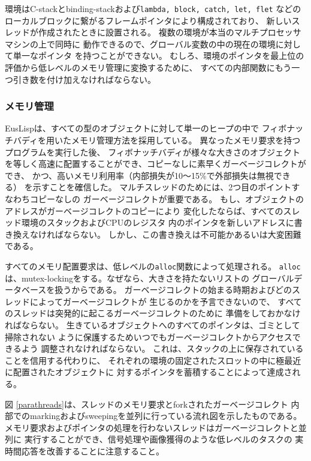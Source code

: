 環境はC-stackとbinding-stackおよび{\tt lambda, block, catch, let, flet}
などのローカルブロックに繋がるフレームポインタにより構成されており、
新しいスレッドが作成されたときに設置される。
複数の環境が本当のマルチプロセッサマシンの上で同時に
動作できるので、グローバル変数の中の現在の環境に対して単一なポインタ
を持つことができない。
むしろ、環境のポインタを最上位の評価から低レベルのメモリ管理に変換するために、
すべての内部関数にもう一つ引き数を付け加えなければならない。

\subsubsection{メモリ管理}
EusLispは、すべての型のオブジェクトに対して単一のヒープの中で
フィボナッチバディを用いたメモリ管理方法を採用している。
異なったメモリ要求を持つプログラムを実行した後、
フィボナッチバディが様々な大きさのオブジェクトを等しく高速に配置することができ、コピーなしに素早くガーベージコレクトができ、
かつ、高いメモリ利用率（内部損失が10〜15\%で外部損失は無視できる）
を示すことを確信した。
マルチスレッドのためには、2つ目のポイントすなわちコピーなしの
ガーベージコレクトが重要である。
もし、オブジェクトのアドレスがガーベージコレクトのコピーにより
変化したならば、すべてのスレッド環境のスタックおよびCPUのレジスタ
内のポインタを新しいアドレスに書き換えなければならない。
しかし、この書き換えは不可能かあるいは大変困難である。

すべてのメモリ配置要求は、低レベルの{\tt alloc}関数によって処理される。
{\tt alloc}は、mutex-lockingをする。なぜなら、大きさを持たないリストの
グローバルデータベースを扱うからである。
ガーベージコレクトの始まる時期およびどのスレッドによってガーベージコレクトが
生じるのかを予言できないので、
すべてのスレッドは突発的に起こるガーベージコレクトのために
準備をしておかなければならない。
生きているオブジェクトへのすべてのポインタは、ゴミとして掃除されない
ように保護するためいつでもガーベージコレクトからアクセスできるよう
調整されなければならない。
これは、スタックの上に保存されていることを信用する代わりに、
それぞれの環境の固定されたスロットの中に極最近に配置されたオブジェクトに
対するポインタを蓄積することによって達成される。

図 \ref{parathreads}は、スレッドのメモリ要求とforkされたガーベージコレクト
内部でのmarkingおよびsweepingを並列に行っている流れ図を示したものである。
メモリ要求およびポインタの処理を行わないスレッドはガーベージコレクトと並列に
実行することができ、信号処理や画像獲得のような低レベルのタスクの
実時間応答を改善することに注意すること。

